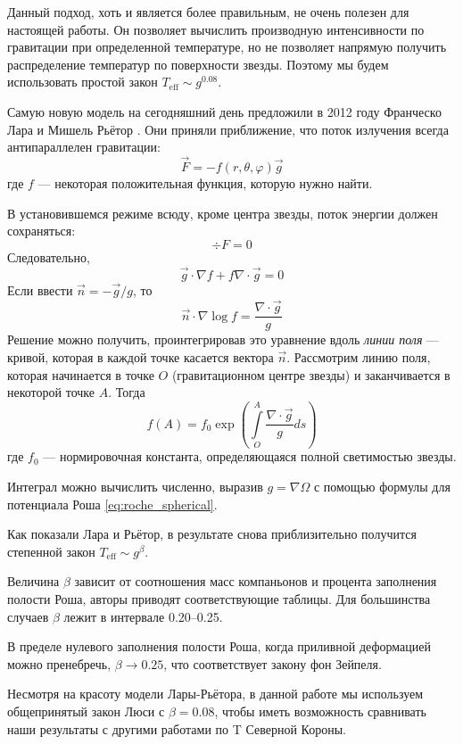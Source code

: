 Данный подход, хоть и является более правильным, не очень полезен для настоящей работы. Он позволяет вычислить производную интенсивности по гравитации при определенной температуре, но не позволяет напрямую получить распределение температур по поверхности звезды. Поэтому мы будем использовать простой закон $T_\text{eff} \sim g^{0.08}$.



Самую новую модель на сегодняшний день предложили в 2012 году Франческо Лара и Мишель Рьётор \cite{LaraRieutord}. Они приняли приближение, что поток излучения всегда антипараллелен гравитации:
\[
\vec F = -f(r, \theta, \varphi) \vec g
\]
где $f$ --- некоторая положительная функция, которую нужно найти.

В установившемся режиме всюду, кроме центра звезды, поток энергии должен сохраняться:
\[
\div F = 0
\]
Следовательно,
\[
\vec g \cdot \nabla f + f \nabla \cdot \vec g = 0
\]
Если ввести $\vec n = -\vec g / g$, то
\[
\vec n \cdot \nabla \log f = \frac{\nabla \cdot \vec g}{g}
\]
Решение можно получить, проинтегрировав это уравнение вдоль \emph{линии поля} --- кривой, которая в каждой точке касается вектора $\vec n$. Рассмотрим линию поля, которая начинается в точке $O$ (гравитационном центре звезды) и заканчивается в некоторой точке $A$. Тогда
\begin{equation*}
f(A) = f_0 \exp \left(
    {}\int\limits_O^A \frac{\nabla \cdot \vec g}{g} ds
\right)
\label{eq:LaraSolution}
\end{equation*}
где $f_0$ --- нормировочная константа, определяющаяся полной светимостью звезды.

Интеграл можно вычислить численно, выразив $g = \nabla \Omega$ с помощью формулы для потенциала Роша \eqref{eq:roche_spherical}.

Как показали Лара и Рьётор, в результате снова приблизительно получится степенной закон $T_\text{eff} \sim g^\beta$.

Величина $\beta$ зависит от соотношения масс компаньонов и процента заполнения полости Роша, авторы приводят соответствующие таблицы. Для большинства случаев $\beta$ лежит в интервале 0.20--0.25.

В пределе нулевого заполнения полости Роша, когда приливной деформацией можно пренебречь, $\beta \to 0.25$, что соответствует закону фон Зейпеля.

Несмотря на красоту модели Лары-Рьётора, в данной работе мы используем общепринятый закон Люси с $\beta = 0.08$, чтобы иметь возможность сравнивать наши результаты с другими работами по T Северной Короны.


